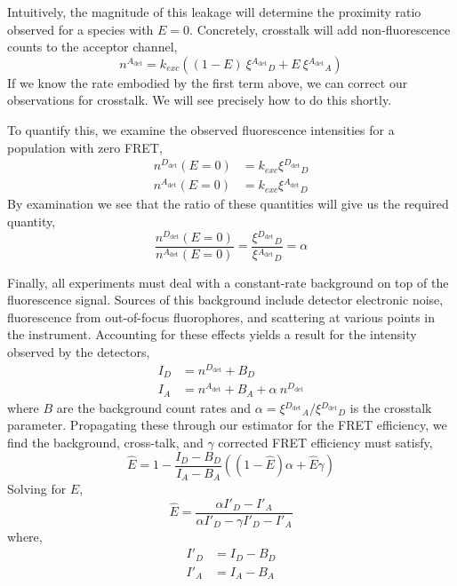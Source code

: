 \documentclass{article}
\newcommand{\dt}[1]{\ensuremath{^{#1_\mathrm{det}}}}   %
\begin{document}
Intuitively, the magnitude of this leakage will determine the
proximity ratio observed for a species with $E=0$. Concretely, crosstalk
will add non-fluorescence counts to the acceptor channel,
\begin{equation*}
  n\dt{A} = k_{exc} \left( (1-E)~\xi\dt{A}_D + E~\xi\dt{A}_A \right)
\end{equation*}
If we know the rate embodied by the first term above, we can correct
our observations for crosstalk. We will see precisely how to do this
shortly.

To quantify this,
we examine the observed fluorescence intensities for a population with
zero FRET,
\begin{align*}
  n\dt{D}(E=0) & = k_{exc} \xi\dt{D}_D \\
  n\dt{A}(E=0) & = k_{exc} \xi\dt{A}_D
\end{align*} 
By examination we see that the ratio of these quantities will give us
the required quantity,
\begin{equation*}
  \frac{n\dt{D}(E=0)}{n\dt{A}(E=0)} = \frac{\xi\dt{D}_D}{\xi\dt{A}_D} = \alpha
\end{equation*}

Finally, all experiments must deal with a constant-rate
background on top of the fluorescence signal. Sources of this background
include detector electronic noise, fluorescence from out-of-focus
fluorophores, and scattering at various points in the instrument.
Accounting for these effects yields a result for the intensity
observed by the detectors,
\begin{align*}
  I_D & = n\dt{D} + B_D \\
  I_A & = n\dt{A} + B_A + \alpha~n\dt{D}
\end{align*} 
where $B$ are the background count rates and $\alpha =
\xi\dt{D}_A / \xi\dt{D}_D$ is the crosstalk parameter. Propagating
these through our estimator for the FRET efficiency, we find the
background, cross-talk, and $\gamma$ corrected FRET efficiency must
satisfy,
\begin{equation}
  \hat E = 1 - \frac{I_D - B_D}{I_A - B_A} \left( (1 - \hat E)\alpha + \hat E \gamma \right)
\end{equation}
Solving for $E$,
\begin{equation}
  \hat E = \frac{\alpha I'_D - I'_A}{\alpha I'_D - \gamma I'_D - I'_A}
\end{equation}
where,
\begin{align*}
  I'_D & = I_D - B_D \\
  I'_A & = I_A - B_A
\end{align*}
\end{document}
